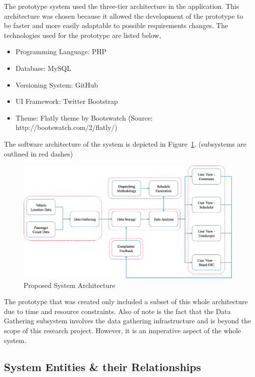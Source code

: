 \documentclass[12pt, oneside]{report}
\begin{document}
The prototype system used the three-tier architecture in the application. This architecture was chosen because it allowed the development of the prototype to be faster and more easily adaptable to possible requirements changes. The technologies used for the prototype are listed below,

\begin {itemize}
\item Programming Language: PHP
\item Database: MySQL
\item Versioning System: GitHub
\item UI Framework: Twitter Bootstrap
\item Theme: Flatly theme by Bootswatch (Source: http://bootswatch.com/2/flatly/)
\end {itemize}

The software architecture of the system is depicted in Figure~\ref{image-proposedSystemArchitecture}. (subsystems are outlined in red dashes)

\begin {figure} [h!]
\centering
\includegraphics [scale=0.45] {proposedSystemArchitecture}
\caption [Proposed System Architecture] {Proposed System Architecture}
\label {image-proposedSystemArchitecture}
\end {figure}

The prototype that was created only included a subset of this whole architecture due to time and resource constraints. Also of note is the fact that the Data Gathering subsystem involves the data gathering infrastructure and is beyond the scope of this research project. However, it is an imperative aspect of the whole system.

\subsection{System Entities \& their Relationships}
\end{document}
